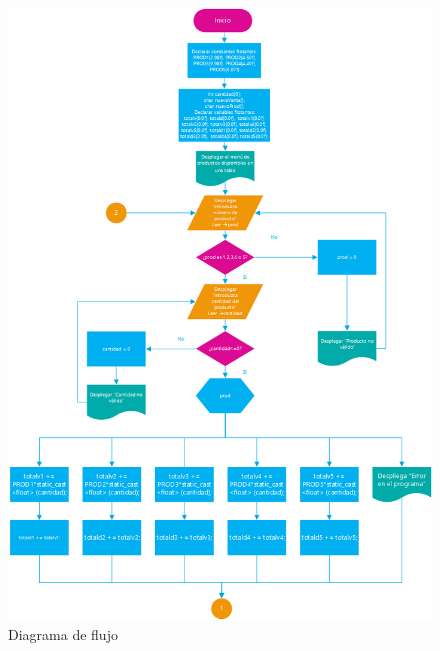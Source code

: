 \documentclass[12pt, letterpaper]{article}
\begin{document}
   
     \begin{figure}[p]
    \centering
    \includegraphics[width=15cm]{D-flujo-p1.png}
    \caption {Diagrama de flujo \label{fig:Fig2}}
    \end{figure} 
    
\end{document}
